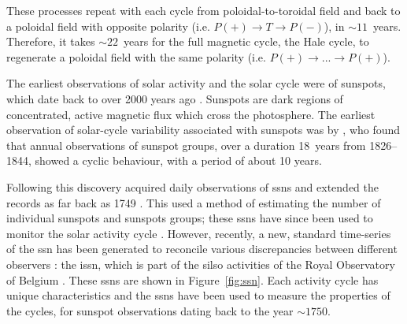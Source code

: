 

These processes repeat with each cycle from poloidal-to-toroidal field and back to a poloidal field with opposite polarity (i.e. $P(+)\rightarrow T\rightarrow P(-)$), in $\sim11$~years. Therefore, it takes $\sim22$~years for the full magnetic cycle, the Hale cycle, to regenerate a poloidal field with the same polarity (i.e. $P(+)\rightarrow ...\rightarrow P(+)$).

The earliest observations of solar activity and the solar cycle were of sunspots, which date back to over 2000 years ago \citep{clark_interpretation_1978}. Sunspots are dark regions of concentrated, active magnetic flux which cross the photosphere. The earliest observation of solar-cycle variability associated with sunspots was by \citet{schwabe_sonnenbeobachtungen_1844}, who found that annual observations of sunspot groups, over a duration 18~years from 1826--1844, showed a cyclic behaviour, with a period of about 10 years.

Following this discovery \citet{wolf_mittheilungen_1856, wolf_extract_1859} acquired daily observations of \glspl{ssn} and extended the records as far back as 1749 \citep{hathaway_solar_2015}. This used a method of estimating the number of individual sunspots and sunspots groups; these \glspl{ssn} have since been used to monitor the solar activity cycle \citep{wolf_extract_1859, wolf_abstract_1861}. However, recently, a new, standard time-series of the \gls{ssn} has been generated to reconcile various discrepancies between different observers \citep{clette_preface_2016,clette_new_2016}: the \gls{issn}, which is part of the \gls{silso} activities of the Royal Observatory of Belgium \citep{silso_world_data_center_international_2020}. These \glspl{ssn} are shown in Figure~\ref{fig:ssn}. Each activity cycle has unique characteristics and the \glspl{ssn} have been used to measure the properties of the cycles, for sunspot observations dating back to the year $\sim1750$.

